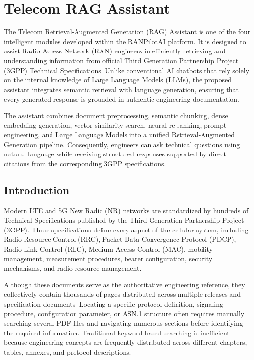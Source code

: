 \chapter{Telecom RAG Assistant}
\label{chap:telecom_rag}

The Telecom Retrieval-Augmented Generation (RAG) Assistant is one of the four intelligent modules developed within the RANPilotAI platform. It is designed to assist Radio Access Network (RAN) engineers in efficiently retrieving and understanding information from official Third Generation Partnership Project (3GPP) Technical Specifications. Unlike conventional AI chatbots that rely solely on the internal knowledge of Large Language Models (LLMs), the proposed assistant integrates semantic retrieval with language generation, ensuring that every generated response is grounded in authentic engineering documentation.

The assistant combines document preprocessing, semantic chunking, dense embedding generation, vector similarity search, neural re-ranking, prompt engineering, and Large Language Models into a unified Retrieval-Augmented Generation pipeline. Consequently, engineers can ask technical questions using natural language while receiving structured responses supported by direct citations from the corresponding 3GPP specifications.

\section{Introduction}

Modern LTE and 5G New Radio (NR) networks are standardized by hundreds of Technical Specifications published by the Third Generation Partnership Project (3GPP). These specifications define every aspect of the cellular system, including Radio Resource Control (RRC), Packet Data Convergence Protocol (PDCP), Radio Link Control (RLC), Medium Access Control (MAC), mobility management, measurement procedures, bearer configuration, security mechanisms, and radio resource management.

Although these documents serve as the authoritative engineering reference, they collectively contain thousands of pages distributed across multiple releases and specification documents. Locating a specific protocol definition, signaling procedure, configuration parameter, or ASN.1 structure often requires manually searching several PDF files and navigating numerous sections before identifying the required information. Traditional keyword-based searching is inefficient because engineering concepts are frequently distributed across different chapters, tables, annexes, and protocol descriptions.

